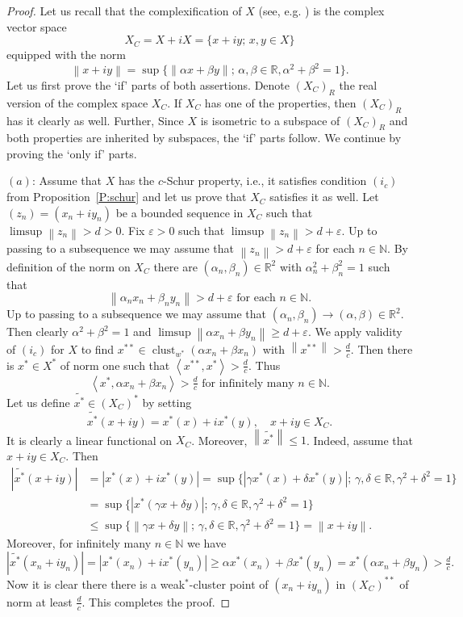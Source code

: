 \documentclass{amsart}
\numberwithin{equation}{section}
\theoremstyle{definition}
\def\ep{\varepsilon}
\def\en{\mathbb N}
\def\er{\mathbb R}
\def\ip#1#2{\left\langle#1,#2\right\rangle}
\def\clu#1{\operatorname{clust}_{w^*}(#1)}
\newcommand{\norm}[1]{\left\|#1\right\|}
\newcommand{\abs}[1]{\left|#1\right|}
\newcommand{\setsep}{;\,}
\begin{document}
\begin{proof}
  Let us recall that the complexification of $X$ (see, e.g. \cite[p. 54]{fhhmpz}) is the complex vector space
  $$X_C=X+iX=\{x+iy\setsep x,y\in X\}$$
  equipped with the norm
  $$\norm{x+iy}=\sup\{\norm{\alpha x+\beta y}\setsep \alpha,\beta\in\er,\alpha^2+\beta^2=1\}.$$
  Let us first prove the `if' parts of both assertions. Denote $(X_C)_R$ the real version of the complex
  space $X_C$. If $X_C$ has one of the properties, then $(X_C)_R$ has it clearly as well. Further, Since $X$
 is isometric to a subspace of $(X_C)_R$ and both properties are inherited by subspaces, the `if' parts follow.  
  We continue by proving the `only if' parts.
  
  $(a)$: Assume that $X$ has the $c$-Schur property, i.e., it satisfies condition $(i_c)$ from Proposition~\ref{P:schur} and let us prove that $X_C$ satisfies it as well.
  Let $(z_n)=(x_n+iy_n)$ be a bounded sequence in $X_C$ such that $\limsup\norm{z_n}>d>0$. Fix $\ep>0$ such that $\limsup\norm{z_n}>d+\ep$. Up to passing to a subsequence we may assume that $\norm{z_n}>d+\ep$ for each $n\in\en$.
  By definition of the norm on $X_C$ there are $(\alpha_n,\beta_n)\in\er^2$ with $\alpha_n^2+\beta_n^2=1$ such that
  $$\norm{\alpha_n x_n+\beta_n y_n}>d+\ep\mbox{ for each }n\in\en.$$
  Up to passing to a subsequence we may assume that $(\alpha_n,\beta_n)\to(\alpha,\beta)\in\er^2$. Then clearly $\alpha^2+\beta^2=1$ and $\limsup \norm{\alpha x_n+\beta y_n}\ge d+\ep$. We apply validity of $(i_c)$ for $X$ to find $x^{**}\in \clu{\alpha x_n+\beta x_n}$ with $\norm{x^{**}}>\frac{d}{c}$. Then there is $x^{*}\in X^*$ of norm one such that $\ip{x^{**}}{x^*}>\frac dc$. Thus
  $$\ip{x^*}{\alpha x_n+\beta x_n}>\tfrac{d}{c}\mbox{ for infinitely many }n\in\en.$$
  Let us define $\widetilde{x^*}\in (X_C)^*$ by setting
  $$\widetilde{x^*}(x+iy)=x^*(x)+i x^*(y),\quad x+iy\in X_C.$$
  It is clearly a linear functional on $X_C$. Moreover, $\norm{\widetilde{x^*}}\le 1$. Indeed, assume that $x+iy\in X_C$. Then
  $$\begin{aligned}
   \abs{\widetilde{x^*}(x+iy)}&=\abs{x^*(x)+i x^*(y)} = \sup\{ \abs{\gamma x^*(x)+\delta x^*(y)}\setsep \gamma,\delta\in\er,\gamma^2+\delta^2=1\}\\
   &
   =\sup\{ \abs{x^*(\gamma x+\delta y)}\setsep \gamma,\delta\in\er,\gamma^2+\delta^2=1\}\\&\le 
   \sup\{ \norm{\gamma x+\delta y}\setsep \gamma,\delta\in\er,\gamma^2+\delta^2=1\}=\norm{x+iy}.
  \end{aligned}$$
Moreover, for infinitely many $n\in\en$ we have
$$\abs{\widetilde{x^*}(x_n+iy_n)}=\abs{x^*(x_n)+i x^*(y_n)}\ge \alpha x^*(x_n)+\beta x^*(y_n)=x^*(\alpha x_n+\beta y_n)>\tfrac dc.$$
Now it is clear there there is a weak$^*$-cluster point of $(x_n+i y_n)$ in $(X_C)^{**}$ of norm at least $\frac dc$. This completes the proof.  


\end{proof}
\end{document}
